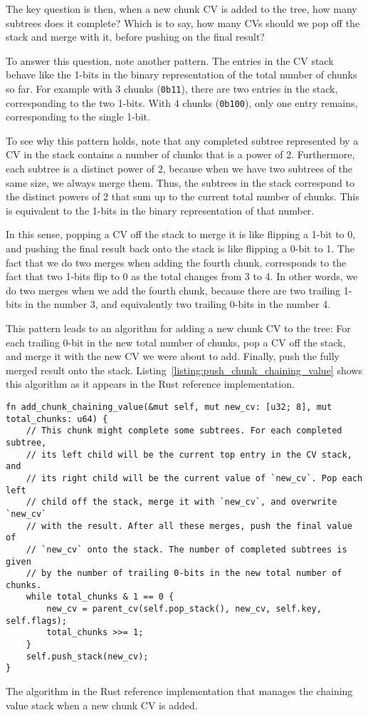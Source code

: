 \documentclass[11pt,notitlepage,a4paper]{article}
\begin{document}
The key question is then, when a new chunk CV is added to the tree, how many
subtrees does it complete? Which is to say, how many CVs should we pop off the
stack and merge with it, before pushing on the final result?

To answer this question, note another pattern. The entries in the CV stack
behave like the 1-bits in the binary representation of the total number of
chunks so far. For example with 3 chunks (\texttt{0b11}), there are two entries in the
stack, corresponding to the two 1-bits. With 4 chunks (\texttt{0b100}), only one entry
remains, corresponding to the single 1-bit.

To see why this pattern holds, note that any completed subtree represented by a
CV in the stack contains a number of chunks that is a power of 2. Furthermore,
each subtree is a distinct power of 2, because when we have two subtrees of the
same size, we always merge them. Thus, the subtrees in the stack correspond to
the distinct powers of 2 that sum up to the current total number of chunks.
This is equivalent to the 1-bits in the binary representation of that number.

In this sense, popping a CV off the stack to merge it is like flipping a 1-bit
to 0, and pushing the final result back onto the stack is like flipping a 0-bit
to 1. The fact that we do two merges when adding the fourth chunk, corresponds
to the fact that two 1-bits flip to 0 as the total changes from 3 to 4. In
other words, we do two merges when we add the fourth chunk, because there are
two trailing 1-bits in the number 3, and equivalently two trailing 0-bits in
the number 4.

This pattern leads to an algorithm for adding a new chunk CV to the tree: For
each trailing 0-bit in the new total number of chunks, pop a CV off the stack,
and merge it with the new CV we were about to add. Finally, push the fully
merged result onto the stack. Listing~\ref{listing:push_chunk_chaining_value}
shows this algorithm as it appears in the Rust reference implementation.

\begin{listing}[h]
\begin{verbatim}
fn add_chunk_chaining_value(&mut self, mut new_cv: [u32; 8], mut total_chunks: u64) {
    // This chunk might complete some subtrees. For each completed subtree,
    // its left child will be the current top entry in the CV stack, and
    // its right child will be the current value of `new_cv`. Pop each left
    // child off the stack, merge it with `new_cv`, and overwrite `new_cv`
    // with the result. After all these merges, push the final value of
    // `new_cv` onto the stack. The number of completed subtrees is given
    // by the number of trailing 0-bits in the new total number of chunks.
    while total_chunks & 1 == 0 {
        new_cv = parent_cv(self.pop_stack(), new_cv, self.key, self.flags);
        total_chunks >>= 1;
    }
    self.push_stack(new_cv);
}
\end{verbatim}
\caption{The algorithm in the Rust reference implementation that manages the
    chaining value stack when a new chunk CV is added.}
\label{listing:push_chunk_chaining_value}
\end{listing}
\end{document}
